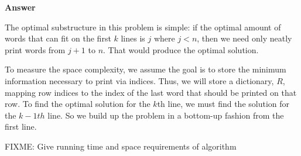 \documentclass[]{book}
\theoremstyle{definition}
\begin{document}
\textbf{Answer}

    The optimal substructure in this problem is simple: if the optimal
    amount of words that can fit on the first $k$ lines is $j$ where $j < n$,
    then we need only neatly print words from $j+1$ to $n$. That would
    produce the optimal solution.

    To measure the space complexity, we assume the goal is to store the
    minimum information necessary to print via indices. Thus,
    we will store a dictionary, $R$, mapping row indices to the index
    of the last word that should be printed on that row. To find the
    optimal solution for the $k$th line, we must find the solution
    for the $k-1th$ line. So we build up the problem in a bottom-up
    fashion from the first line.



FIXME: Give running time and space requirements of algorithm
\end{document}
